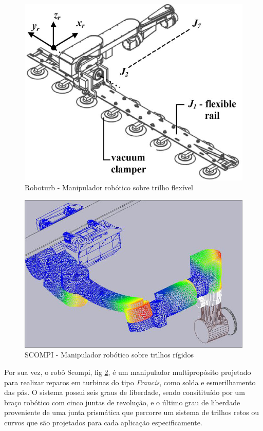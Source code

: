     \begin{figure}[h!]	
		\includegraphics[width=\columnwidth]{figs/trilhos/roboturbpaper}
		\caption{Roboturb - Manipulador robótico sobre trilho flexível}
		\label{fig::roboturb}
	\end{figure}
	\begin{figure}[h!]
		\includegraphics[width=\columnwidth]{figs/trilhos/scompi}
		\caption{SCOMPI - Manipulador robótico sobre trilhos rígidos}
		\label{fig::scompi}
	\end{figure}

Por sua vez, o robô Scompi, fig \ref{fig::scompi}, é um manipulador
multipropósito projetado para realizar reparos em turbinas do tipo \textit{Francis},
 como solda e esmerilhamento das pás. O sistema possui seis graus de liberdade,
 sendo consitituído por um braço robótico com cinco juntas de revolução, e o
 último grau de liberdade proveniente de uma junta prismática que percorre um sistema de 
 trilhos retos ou curvos que são projetados para cada aplicação especificamente. 


